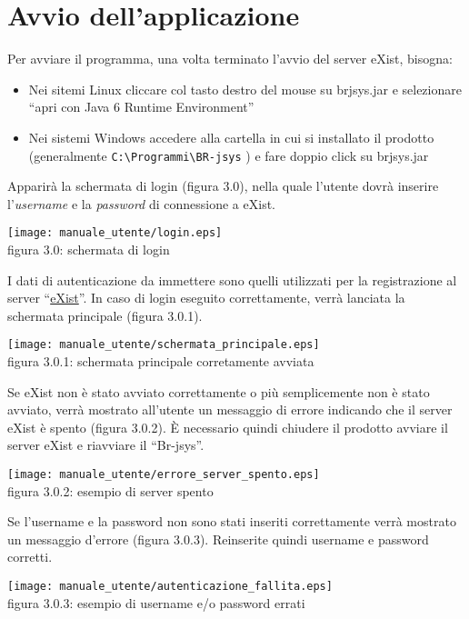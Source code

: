 \section{Avvio dell'applicazione}
Per avviare il programma, una volta terminato l'avvio del server eXist, bisogna:
\begin{itemize}
 \item Nei sitemi Linux cliccare col tasto destro del mouse su brjsys.jar e selezionare ``apri con Java 6 Runtime Environment''
\item Nei sistemi Windows accedere alla cartella in cui si installato il prodotto (generalmente \texttt{C:\textbackslash Programmi\textbackslash BR-jsys} ) e fare doppio click su brjsys.jar 
\end{itemize}
Apparir\`a la schermata di login (figura 3.0), nella quale l'utente dovr\`a inserire l'\textit{username} e la \textit{password} di connessione a eXist.
\begin{center}
\texttt{[image: manuale\_utente/login.eps]}\\
 figura 3.0: schermata di login
\end{center}
I dati di autenticazione da immettere sono quelli utilizzati per la registrazione al server ``\underline{eXist}''.
In caso di login eseguito correttamente, verr\`a lanciata la schermata principale (figura 3.0.1).
\begin{center}
\texttt{[image: manuale\_utente/schermata\_principale.eps]}\\
 figura 3.0.1: schermata principale corretamente avviata
\end{center}
Se eXist non \`e stato avviato correttamente o pi\`u semplicemente non \`e stato avviato, verr\`a mostrato all'utente un messaggio di errore indicando che il server eXist \`e spento (figura 3.0.2). \`E necessario quindi chiudere il prodotto avviare il server eXist e riavviare il ``Br-jsys''.
\begin{center}
\texttt{[image: manuale\_utente/errore\_server\_spento.eps]}\\
 figura 3.0.2: esempio di server spento
\end{center} 
Se l'username e la password non sono stati inseriti correttamente verr\`a mostrato un messaggio d'errore (figura 3.0.3). Reinserite quindi username e password corretti.
\begin{center}
\texttt{[image: manuale\_utente/autenticazione\_fallita.eps]}\\
figura 3.0.3: esempio di username e/o password errati
\end{center}

